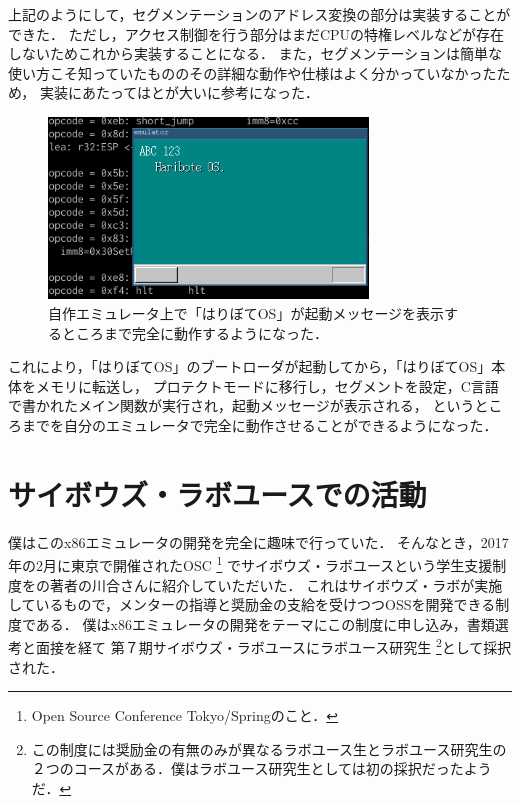 \documentclass[10pt,a4j]{jsarticle}
\begin{document}
上記のようにして，セグメンテーションのアドレス変換の部分は実装することができた．
ただし，アクセス制御を行う部分はまだCPUの特権レベルなどが存在しないためこれから実装することになる．
また，セグメンテーションは簡単な使い方こそ知っていたもののその詳細な動作や仕様はよく分かっていなかったため，
実装にあたっては\cite[はじめて読む486]{read-486}と\cite[SDM]{SDM}が大いに参考になった．

\begin{figure}
	\vspace{-7mm}
	\caption{自作エミュレータ上で「はりぼてOS」が起動メッセージを表示するところまで完全に動作するようになった．}
	\includegraphics[width=85mm]{emu.png}
\end{figure}

これにより，「はりぼてOS」のブートローダが起動してから，「はりぼてOS」本体をメモリに転送し，
プロテクトモードに移行し，セグメントを設定，C言語で書かれたメイン関数が実行され，起動メッセージが表示される，
というところまでを自分のエミュレータで完全に動作させることができるようになった．
\vspace{13mm}
\section{サイボウズ・ラボユースでの活動}

僕はこのx86エミュレータの開発を完全に趣味で行っていた．
そんなとき，2017年の2月に東京で開催されたOSC
\footnote{Open Source Conference Tokyo/Springのこと．}
でサイボウズ・ラボユースという学生支援制度を\cite{30days-osdev}の著者の川合さんに紹介していただいた．
これはサイボウズ・ラボが実施しているもので，メンターの指導と奨励金の支給を受けつつOSSを開発できる制度である．
僕はx86エミュレータの開発をテーマにこの制度に申し込み，書類選考と面接を経て
第７期サイボウズ・ラボユースにラボユース研究生
\footnote{この制度には奨励金の有無のみが異なるラボユース生とラボユース研究生の２つのコースがある．僕はラボユース研究生としては初の採択だったようだ．}として採択された．
\end{document}
